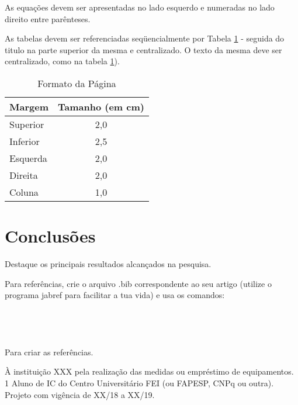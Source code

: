 \documentclass[a4paper,10pt,twocolumn,fleqn]{article}
\begin{document}
    As equações devem ser apresentadas no lado esquerdo e numeradas no lado direito entre parênteses.
    
    As tabelas devem ser referenciadas seqüencialmente por Tabela \ref{tab:tab_margem} - seguida do titulo na parte superior da mesma e centralizado. O texto da mesma deve ser centralizado, como na tabela \ref{tab:tab_margem}).
    
    \begin{table}[h]
        \caption{Formato da Página}
        \centering
        \label{tab:tab_margem}
        \begin{tabular}{@{}|l|c|@{}}
            \toprule
            \textbf{Margem} & \multicolumn{1}{l|}{\textbf{Tamanho (em cm)}} \\ \midrule
            Superior        & 2,0                                           \\ \midrule
            Inferior        & 2,5                                           \\ \midrule
            Esquerda        & 2,0                                           \\ \midrule
            Direita         & 2,0                                           \\ \midrule
            Coluna          & 1,0                                           \\ \bottomrule
        \end{tabular}
    \end{table}
    
    
    \section{Conclusões}\label{sec:conclusion}
    
    Destaque os principais resultados alcançados na pesquisa.
    
    Para referências, crie o arquivo .bib correspondente ao seu artigo (utilize o programa jabref para facilitar a tua vida) e usa os comandos:
    \begin{verbatim}
    
    
    
    \end{verbatim}
    
    Para criar as referências.

    
    
    

   
    \begin{agradecimentos}
    À instituição XXX pela realização das medidas ou
    empréstimo de equipamentos.
    1 Aluno de IC do Centro Universitário FEI (ou FAPESP,
    CNPq ou outra). Projeto com vigência de XX/18 a XX/19.   
    \end{agradecimentos} 
     
    
\end{document}
